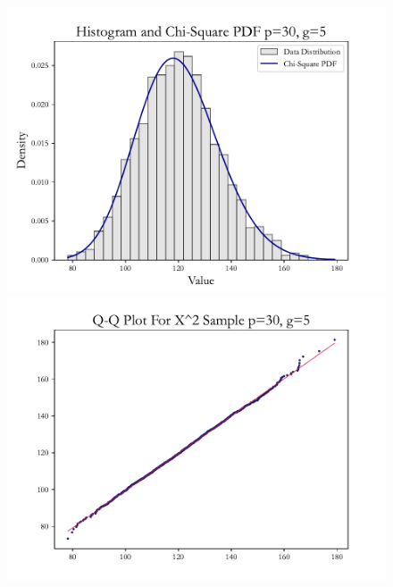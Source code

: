 \documentclass{article} %
\begin{document}
\begin{figure}[H]
    \begin{minipage}[b]{0.49\textwidth}
        \centering
        \includegraphics[width=\textwidth]{img/b/hist_plot_p=30_g=5.pdf}
    \end{minipage}
    \hfill
    \begin{minipage}[b]{0.49\textwidth}
        \centering
        \includegraphics[width=\textwidth]{img/b/qq_plot_p=30_g=5.pdf}
    \end{minipage}
    \hfill
    \begin{minipage}[b]{0.49\textwidth}
        \centering

\end{minipage}
\end{figure}
\end{document}
